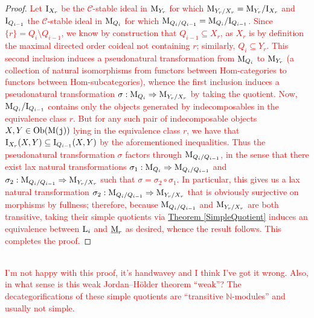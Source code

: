 \begin{proof}
\noindent \textcolor{red}{Let $\textup{I}_{X_r}$ be the $\mathscr{C}$-stable ideal in $\textup{M}_{Y_r}$ for which $\textup{M}_{Y_r/X_r} = \textup{M}_{Y_r}/\textup{I}_{X_r}$ and $\textup{I}_{Q_{i-1}}$ the $\mathscr{C}$-stable ideal in $\textup{M}_{Q_i}$ for which $\textup{M}_{Q_i/Q_{i-1}} = \textup{M}_{Q_i}/\textup{I}_{Q_{i-1}}$. Since $\{r\} = Q_i\setminus Q_{i-1}$, we know by construction that $Q_{i-1} \subseteq X_r$, as $X_r$ is by definition the maximal directed order coideal not containing $r$; similarly, $Q_i \subseteq Y_r$. This second inclusion induces a pseudonatural transformation from $\textup{M}_{Q_i}$ to $\textup{M}_{Y_r}$ (a collection of natural isomorphisms from functors between Hom-categories to functors between Hom-subcategories), whence the first inclusion induces a pseudonatural transformation $\sigma : \textup{M}_{Q_i} \Rightarrow \textup{M}_{Y_r/X_r}$ by taking the quotient. Now, $\textup{M}_{Q_i}/\textup{I}_{Q_{i-1}}$ contains only the objects generated by indecomposables in the equivalence class $r$. But for any such pair of indecomposable objects $X, Y \in \textup{Ob}(\textup{M}(\textup{\texttt{j}}))$ lying in the equivalence class $r$, we have that $\textup{I}_{X_r}(X, Y) \subseteq \textup{I}_{Q_{i-1}}(X, Y)$ by the aforementioned inequalities. Thus the pseudonatural transformation $\sigma$ factors through $\textup{M}_{Q_i/Q_{i-1}}$, in the sense that there exist lax natural transformations $\sigma_1 : \textup{M}_{Q_i} \Rightarrow \textup{M}_{Q_i/Q_{i-1}}$ and $\sigma_2 : \textup{M}_{Q_i/Q_{i-1}} \Rightarrow \textup{M}_{Y_r/X_r}$ such that $\sigma = \sigma_2 \circ \sigma_1$. In particular, this gives us a lax natural transformation $\sigma_2 : \textup{M}_{Q_i/Q_{i-1}} \Rightarrow \textup{M}_{Y_r/X_r}$ that is obviously surjective on morphisms by fullness; therefore, because $\textup{M}_{Q_i/Q_{i-1}}$ and $\textup{M}_{Y_r/X_r}$ are both transitive, taking their simple quotients via \hyperref[SimpleQuotient]{Theorem \ref*{SimpleQuotient}} induces an equivalence between $\textup{L}_i$ and $\underline{\textup{M}}_r$ as desired, whence the result follows. This completes the proof.}
\end{proof}\\

\noindent\textcolor{red}{I'm not happy with this proof, it's handwavey and I think I've got it wrong. Also, in what sense is this weak Jordan--H\"{o}lder theorem ``weak''? The decategorifications of these simple quotients are ``transitive $\mathbb{N}$-modules'' and usually not simple.}\\
\newpage

